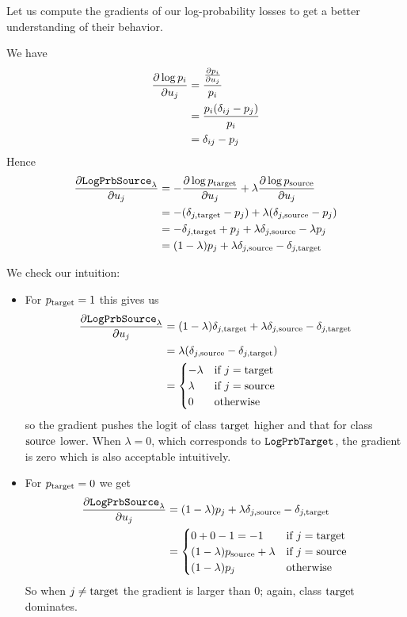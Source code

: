 \documentclass[../main.tex]{subfiles}
\begin{document}
Let us compute the gradients of our log-probability losses to get a better understanding of their behavior.

We have
\begin{align*}
    \frac{\partial \log p_i}{\partial u_j}
     & = \frac{\frac{\partial p_i}{\partial u_j} }{p_i}  \\
     & = \frac{p_i (\delta_{ij} - p_j) }{p_i} \\
     & = \delta_{ij} - p_j
\end{align*}
Hence
\begin{align*}
    \frac{\partial \mathtt{LogPrbSource}_{\lambda}}{\partial u_j}
     & = - \frac{\partial \log p_{\mathrm{target}}}{\partial u_j} + \lambda \frac{\partial \log p_{\mathrm{source}}}{\partial u_j} \\
     & = - (\delta_{j, \mathrm{target}} - p_j) + \lambda (\delta_{j, \mathrm{source}} - p_j)                             \\
     & = - \delta_{j, \mathrm{target}} + p_j + \lambda \delta_{j, \mathrm{source}} - \lambda p_j                         \\
     & = (1 - \lambda) p_j + \lambda \delta_{j, \mathrm{source}} - \delta_{j, \mathrm{target}}
\end{align*}

We check our intuition:
\begin{itemize}
    \item For $p_{\mathrm{target}} = 1$ this gives us
          \begin{align*}
              \frac{\partial \mathtt{LogPrbSource}_{\lambda}}{\partial u_j}
               & = (1 - \lambda) \delta_{j, \mathrm{target}} + \lambda \delta_{j, \mathrm{source}} - \delta_{j, \mathrm{target}} \\
               & = \lambda(\delta_{j, \mathrm{source}} - \delta_{j, \mathrm{target}})                     \\
               & = \begin{cases}
                       -\lambda & \text{if } j = \mathrm{target} \\
                       \lambda  & \text{if } j = \mathrm{source} \\
                       0        & \text{otherwise}
                   \end{cases}
          \end{align*}
          so the gradient pushes the logit of class $\mathrm{target}$ higher and that for class $\mathrm{source}$ lower.
          When $\lambda = 0$, which corresponds to $\mathtt{LogPrbTarget}$, the gradient is zero which is also acceptable intuitively.

    \item For $p_{\mathrm{target}} = 0$ we get
          \begin{align*}
              \frac{\partial \mathtt{LogPrbSource}_{\lambda}}{\partial u_j}
               & = (1 - \lambda) p_j + \lambda \delta_{j, \mathrm{source}} - \delta_{j, \mathrm{target}}                 \\
               & = \begin{cases}
                       0 + 0 - 1 = -1                 & \text{if } j = \mathrm{target} \\
                       (1-\lambda)p_{\mathrm{source}} + \lambda & \text{if } j = \mathrm{source} \\
                       (1 - \lambda) p_j              & \text{otherwise}
                   \end{cases}
          \end{align*}
          So when $j \neq \mathrm{target}$ the gradient is larger than 0; again, class $\mathrm{target}$ dominates.
\end{itemize}
\end{document}
